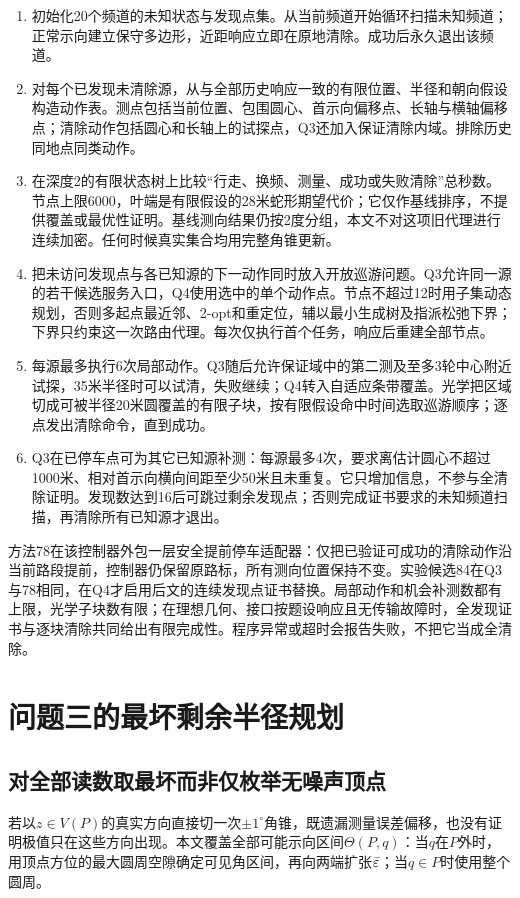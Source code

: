 \documentclass[UTF8,a4paper,zihao=-4,fontset=fandol]{ctexart}
\begin{document}
\begin{enumerate}
\item 初始化20个频道的未知状态与发现点集。从当前频道开始循环扫描未知频道；正常示向建立保守多边形，近距响应立即在原地清除。成功后永久退出该频道。
\item 对每个已发现未清除源，从与全部历史响应一致的有限位置、半径和朝向假设构造动作表。测点包括当前位置、包围圆心、首示向偏移点、长轴与横轴偏移点；清除动作包括圆心和长轴上的试探点，Q3还加入保证清除内域。排除历史同地点同类动作。
\item 在深度2的有限状态树上比较“行走、换频、测量、成功或失败清除”总秒数。节点上限6000，叶端是有限假设的28米蛇形期望代价；它仅作基线排序，不提供覆盖或最优性证明。基线测向结果仍按2度分组，本文不对这项旧代理进行连续加密。任何时候真实集合均用完整角锥更新。
\item 把未访问发现点与各已知源的下一动作同时放入开放巡游问题。Q3允许同一源的若干候选服务入口，Q4使用选中的单个动作点。节点不超过12时用子集动态规划，否则多起点最近邻、2-opt和重定位，辅以最小生成树及指派松弛下界；下界只约束这一次路由代理。每次仅执行首个任务，响应后重建全部节点。
\item 每源最多执行6次局部动作。Q3随后允许保证域中的第二测及至多3轮中心附近试探，35米半径时可以试清，失败继续；Q4转入自适应条带覆盖。光学把区域切成可被半径20米圆覆盖的有限子块，按有限假设命中时间选取巡游顺序；逐点发出清除命令，直到成功。
\item Q3在已停车点可为其它已知源补测：每源最多4次，要求离估计圆心不超过1000米、相对首示向横向间距至少50米且未重复。它只增加信息，不参与全清除证明。发现数达到16后可跳过剩余发现点；否则完成证书要求的未知频道扫描，再清除所有已知源才退出。
\end{enumerate}

方法78在该控制器外包一层安全提前停车适配器：仅把已验证可成功的清除动作沿当前路段提前，控制器仍保留原路标，所有测向位置保持不变。实验候选84在Q3与78相同，在Q4才启用后文的连续发现点证书替换。局部动作和机会补测数都有上限，光学子块数有限；在理想几何、接口按题设响应且无传输故障时，全发现证书与逐块清除共同给出有限完成性。程序异常或超时会报告失败，不把它当成全清除。

\section{问题三的最坏剩余半径规划}
\subsection{对全部读数取最坏而非仅枚举无噪声顶点}
若以$z\in V(P)$的真实方向直接切一次$\pm1^\circ$角锥，既遗漏测量误差偏移，也没有证明极值只在这些方向出现。本文覆盖全部可能示向区间$\Theta(P,q)$：当$q$在$P$外时，用顶点方位的最大圆周空隙确定可见角区间，再向两端扩张$\bar\varepsilon$；当$q\in P$时使用整个圆周。
\end{document}
